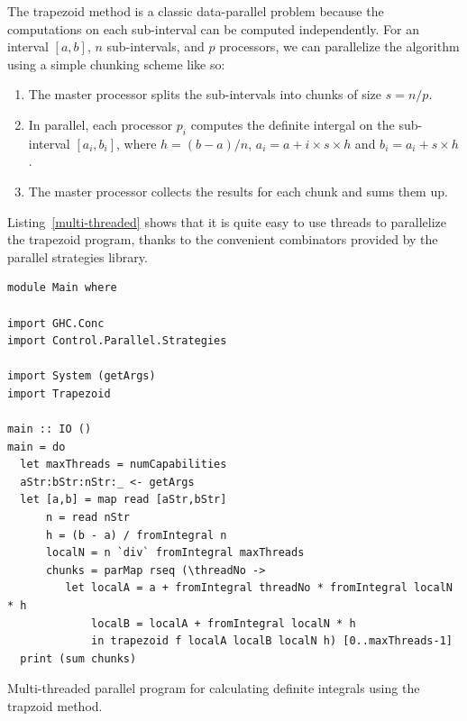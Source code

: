\documentclass{tmr}
\begin{document}
The trapezoid method is a classic data-parallel problem because
the computations on each sub-interval can be computed independently.
For an interval $[a,b]$, $n$ sub-intervals, and $p$ processors, we can parallelize
the algorithm using a simple chunking scheme like so:
\begin{enumerate}
   \item The master processor splits the sub-intervals into chunks of size $s = n/p$.
   \item In parallel, each processor $p_i$ computes the definite intergal on the sub-interval 
         $[a_i, b_i]$, where $h = (b - a)/n$, $a_i = a + i \times s \times h$ and
         $b_i = a_i + s \times h$.
   \item The master processor collects the results for each chunk and sums them up.
\end{enumerate}
Listing~\ref{multi-threaded} shows that it is quite easy to use threads to
parallelize the trapezoid program, thanks to the convenient combinators provided by the
parallel strategies library.

\begin{listing}
\begin{Verbatim}
module Main where

import GHC.Conc
import Control.Parallel.Strategies

import System (getArgs)
import Trapezoid

main :: IO ()
main = do
  let maxThreads = numCapabilities
  aStr:bStr:nStr:_ <- getArgs
  let [a,b] = map read [aStr,bStr]
      n = read nStr
      h = (b - a) / fromIntegral n
      localN = n `div` fromIntegral maxThreads
      chunks = parMap rseq (\threadNo ->
         let localA = a + fromIntegral threadNo * fromIntegral localN * h
             localB = localA + fromIntegral localN * h
             in trapezoid f localA localB localN h) [0..maxThreads-1]
  print (sum chunks)
\end{Verbatim}
\caption{Multi-threaded parallel program for calculating definite integrals using the trapzoid method. \label{multi-threaded}}
\end{listing}


\end{document}
